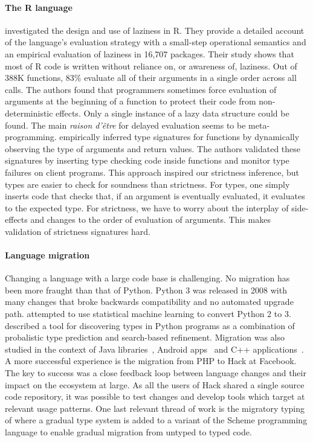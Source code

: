 \documentclass[review,nonacm,screen,acmsmall,anonymous=true]{acmart}
\newcommand{\authorcomment}[3]{}
\newcommand{\OF}[1]{\authorcomment{magenta}{OF}{#1}}
\begin{document}
\paragraph{The R language} \citet{oopsla19b} investigated the design and use of
laziness in R. They provide a detailed account of the language's evaluation
strategy with a small-step operational semantics and an empirical evaluation of
laziness in 16,707 packages. Their study shows that most of R code is written
without reliance on, or awareness of, laziness. Out of 388K functions, 83\%
evaluate all of their arguments in a single order across all calls. The authors
found that programmers sometimes force evaluation of arguments at the beginning
of a function to protect their code from non-deterministic effects. Only a
single instance of a lazy data structure could be found. The main \emph{raison
d'\^etre} for delayed evaluation seems to be meta-programming. \citet{oopsla20b}
empirically inferred type signatures for functions by dynamically observing the
type of arguments and return values. The authors validated these signatures by
inserting type checking code inside functions and monitor type failures on
client programs. This approach inspired our strictness inference, but types are
easier to check for soundness than strictness. For types, one simply inserts
code that checks that, if an argument is eventually evaluated, it evaluates to
the expected type. For strictness, we have to worry about the interplay of
side-effects and changes to the order of evaluation of arguments. This makes
validation of strictness signatures hard.

\paragraph{Language migration} Changing a language with a large code base
is challenging. No migration has been more fraught than that of Python. Python 3
was released in 2008 with many changes that broke backwards compatibility and no
automated upgrade path. \citet{Agg15} attempted to use statistical machine
learning to convert Python 2 to 3. \citet{Pra20} described a tool for
discovering types in Python programs as a combination of probalistic type
prediction and search-based refinement. Migration was also studied in the context of
Java libraries~\cite{Xu19}, Android apps~\cite{Orso20} and C++
applications~\cite{OB20}. A more successful experience is the migration from PHP
to Hack at Facebook. The key to success was a close feedback loop between
language changes and their impact on the ecosystem at large. As all the users of
Hack shared a single source code repository, it was possible to test changes and
develop tools which target at relevant usage patterns\OF{cite? private
communications?}. One last relevant thread of
work is the migratory typing of \citet{matthias06} where a gradual type system
is added to a variant of the Scheme programming language to enable gradual
migration from untyped to typed code.
\end{document}
